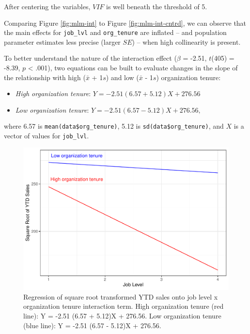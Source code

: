 \documentclass[
]{book}
\providecommand{\tightlist}{%
  \setlength{\itemsep}{0pt}\setlength{\parskip}{0pt}}
\begin{document}
After centering the variables, \(VIF\) is well beneath the threshold of 5.

Comparing Figure \ref{fig:mlm-int} to Figure \ref{fig:mlm-int-cntrd}, we can observe that the main effects for \texttt{job\_lvl} and \texttt{org\_tenure} are inflated -- and population parameter estimates less precise (larger \(SE\)) -- when high collinearity is present.

To better understand the nature of the interaction effect (\(\beta\) = -2.51, \(t\)(405) = -8.39, \(p\) \textless{} .001), two equations can be built to evaluate changes in the slope of the relationship with high (\(\bar{x}\) + 1\(s\)) and low (\(\bar{x}\) - 1\(s\)) organization tenure:

\begin{itemize}
\tightlist
\item
  \emph{High organization tenure}: \(Y = -2.51 (6.57 + 5.12)X + 276.56\)
\item
  \emph{Low organization tenure}: \(Y = -2.51 (6.57 - 5.12)X + 276.56,\)
\end{itemize}

where 6.57 is \texttt{mean(data\$org\_tenure)}, 5.12 is \texttt{sd(data\$org\_tenure)}, and \(X\) is a vector of values for \texttt{job\_lvl}.

\begin{figure}

{\centering \includegraphics[width=1\linewidth]{People_Analytics_Lifecycle_files/figure-latex/int-effects-1} 

}

\caption{Regression of square root transformed YTD sales onto job level x organization tenure interaction term. High organization tenure (red line): Y = -2.51 (6.57 + 5.12)X + 276.56. Low organization tenure (blue line): Y = -2.51 (6.57 - 5.12)X + 276.56.}\label{fig:int-effects}
\end{figure}
\end{document}
